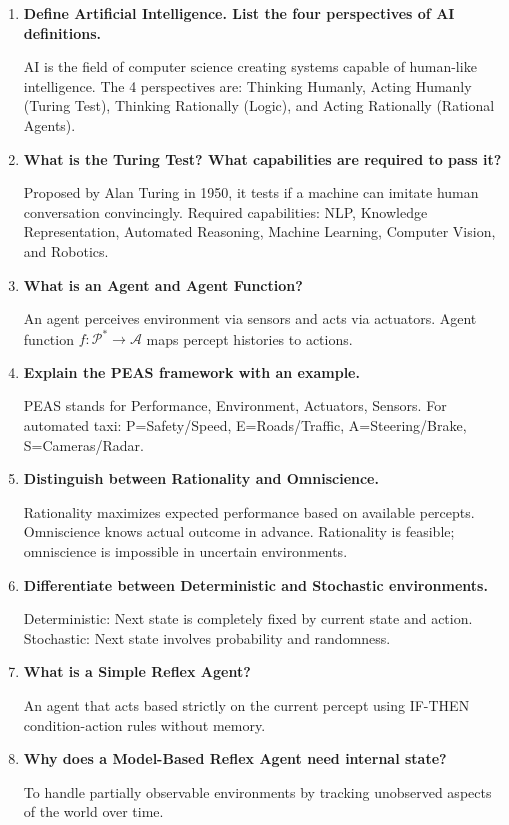 \documentclass[12pt,a4paper]{article}
\newcommand{\Q}[1]{\textbf{#1}\par\noindent\ignorespaces}
\begin{document}
\begin{tcolorbox}[exambox, title={\textbf{Frequently Asked / Viva Questions}}]
  \begin{enumerate}[topsep=0pt, label=\textbf{Q\arabic*.}, itemsep=5pt]
    \item \Q{Define Artificial Intelligence. List the four perspectives of AI definitions.}
    AI is the field of computer science creating systems capable of human-like intelligence. The 4 perspectives are: Thinking Humanly, Acting Humanly (Turing Test), Thinking Rationally (Logic), and Acting Rationally (Rational Agents).

    \item \Q{What is the Turing Test? What capabilities are required to pass it?}
    Proposed by Alan Turing in 1950, it tests if a machine can imitate human conversation convincingly. Required capabilities: NLP, Knowledge Representation, Automated Reasoning, Machine Learning, Computer Vision, and Robotics.

    \item \Q{What is an Agent and Agent Function?}
    An agent perceives environment via sensors and acts via actuators. Agent function $f: \mathcal{P}^* \to \mathcal{A}$ maps percept histories to actions.

    \item \Q{Explain the PEAS framework with an example.}
    PEAS stands for Performance, Environment, Actuators, Sensors. For automated taxi: P=Safety/Speed, E=Roads/Traffic, A=Steering/Brake, S=Cameras/Radar.

    \item \Q{Distinguish between Rationality and Omniscience.}
    Rationality maximizes expected performance based on available percepts. Omniscience knows actual outcome in advance. Rationality is feasible; omniscience is impossible in uncertain environments.

    \item \Q{Differentiate between Deterministic and Stochastic environments.}
    Deterministic: Next state is completely fixed by current state and action. Stochastic: Next state involves probability and randomness.

    \item \Q{What is a Simple Reflex Agent?}
    An agent that acts based strictly on the current percept using IF-THEN condition-action rules without memory.

    \item \Q{Why does a Model-Based Reflex Agent need internal state?}
    To handle partially observable environments by tracking unobserved aspects of the world over time.


\end{enumerate}
\end{tcolorbox}
\end{document}
